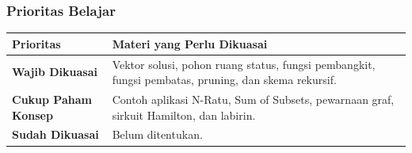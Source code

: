 \subsubsection{Prioritas Belajar}
\begin{tabularx}{\textwidth}{|L{0.22\textwidth}|X|}
\hline
\textbf{Prioritas} & \textbf{Materi yang Perlu Dikuasai} \\
\hline
\textbf{Wajib Dikuasai} & Vektor solusi, pohon ruang status, fungsi pembangkit, fungsi pembatas, pruning, dan skema rekursif. \\
\hline
\textbf{Cukup Paham Konsep} & Contoh aplikasi N-Ratu, Sum of Subsets, pewarnaan graf, sirkuit Hamilton, dan labirin. \\
\hline
\textbf{Sudah Dikuasai} & Belum ditentukan. \\
\hline
\end{tabularx}
